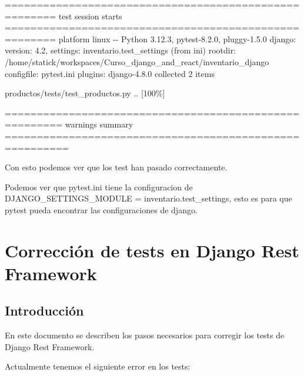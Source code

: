 \documentclass[
  a4paper,
  DIV=11,
  numbers=noendperiod,
  onepage,
  openany]{scrreprt}
\newenvironment{Shaded}{\begin{snugshade}}{\end{snugshade}}
\newcommand{\AttributeTok}[1]{\textcolor[rgb]{0.40,0.45,0.13}{#1}}
\newcommand{\ErrorTok}[1]{\textcolor[rgb]{0.68,0.00,0.00}{#1}}
\newcommand{\ExtensionTok}[1]{\textcolor[rgb]{0.00,0.23,0.31}{#1}}
\newcommand{\KeywordTok}[1]{\textcolor[rgb]{0.00,0.23,0.31}{#1}}
\newcommand{\NormalTok}[1]{\textcolor[rgb]{0.00,0.23,0.31}{#1}}
\newcommand{\PreprocessorTok}[1]{\textcolor[rgb]{0.68,0.00,0.00}{#1}}
\newcommand{\SpecialStringTok}[1]{\textcolor[rgb]{0.13,0.47,0.30}{#1}}
\begin{document}
\begin{Shaded}
\begin{Highlighting}[]
\ExtensionTok{======================================================}\NormalTok{ test session starts ======================================================}
\ExtensionTok{platform}\NormalTok{ linux }\AttributeTok{{-}{-}}\NormalTok{ Python 3.12.3, pytest{-}8.2.0, pluggy{-}1.5.0}
\ExtensionTok{django:}\NormalTok{ version: 4.2, settings: inventario.test\_settings }\ErrorTok{(}\ExtensionTok{from}\NormalTok{ ini}\KeywordTok{)}
\ExtensionTok{rootdir:}\NormalTok{ /home/statick/workspaces/Curso\_django\_and\_react/inventario\_django}
\ExtensionTok{configfile:}\NormalTok{ pytest.ini}
\ExtensionTok{plugins:}\NormalTok{ django{-}4.8.0}
\ExtensionTok{collected}\NormalTok{ 2 items                                                                                                               }

\ExtensionTok{productos/tests/test\_productos.py}\NormalTok{ ..                                                                                      }\PreprocessorTok{[}\SpecialStringTok{100\%}\PreprocessorTok{]}

\ExtensionTok{=======================================================}\NormalTok{ warnings summary ========================================================}
\end{Highlighting}
\end{Shaded}

Con esto podemos ver que los test han pasado correctamente.

Podemos ver que pytest.ini tiene la configuracion de
DJANGO\_SETTINGS\_MODULE = inventario.test\_settings, esto es para que
pytest pueda encontrar las configuraciones de django.

\chapter{Corrección de tests en Django Rest
Framework}\label{correcciuxf3n-de-tests-en-django-rest-framework}

\section{Introducción}\label{introducciuxf3n-1}

En este documento se describen los pasos necesarios para corregir los
tests de Django Rest Framework.

Actualmente tenemos el siguiente error en los tests:
\end{document}

